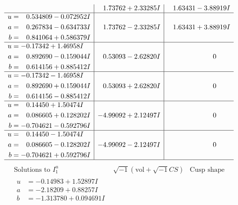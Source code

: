 \documentclass[1p]{elsarticle_modified}
\theoremstyle{definition}
\newcommand{\I}{\sqrt{-1}}
\begin{document}
$$\begin{array}{c|c|c}
 & \phantom{-}1.73762 + 2.33285 I & \phantom{-}1.63431 - 3.88919 I \\ \hline\begin{aligned}
u &= \phantom{-}0.534809 - 0.072952 I \\
a &= \phantom{-}0.267834 - 0.634733 I \\
b &= \phantom{-}0.841064 + 0.586379 I\end{aligned}
 & \phantom{-}1.73762 - 2.33285 I & \phantom{-}1.63431 + 3.88919 I \\ \hline\begin{aligned}
u &= -0.17342 + 1.46958 I \\
a &= \phantom{-}0.892690 - 0.159044 I \\
b &= \phantom{-}0.614156 + 0.885412 I\end{aligned}
 & \phantom{-}0.53093 - 2.62820 I & \phantom{-0.000000 } 0 \\ \hline\begin{aligned}
u &= -0.17342 - 1.46958 I \\
a &= \phantom{-}0.892690 + 0.159044 I \\
b &= \phantom{-}0.614156 - 0.885412 I\end{aligned}
 & \phantom{-}0.53093 + 2.62820 I & \phantom{-0.000000 } 0 \\ \hline\begin{aligned}
u &= \phantom{-}0.14450 + 1.50474 I \\
a &= \phantom{-}0.086605 + 0.128202 I \\
b &= -0.704621 - 0.592796 I\end{aligned}
 & -4.99092 + 2.12497 I & \phantom{-0.000000 } 0 \\ \hline\begin{aligned}
u &= \phantom{-}0.14450 - 1.50474 I \\
a &= \phantom{-}0.086605 - 0.128202 I \\
b &= -0.704621 + 0.592796 I\end{aligned}
 & -4.99092 - 2.12497 I & \phantom{-0.000000 } 0\\
 \hline 
 \end{array}$$\newpage$$\begin{array}{c|c|c}  
\text{Solutions to }I^u_{1}& \I (\text{vol} + \sqrt{-1}CS) & \text{Cusp shape}\\
 \hline 
\begin{aligned}
u &= -0.14983 + 1.52897 I \\
a &= -2.18209 + 0.88257 I \\
b &= -1.313780 + 0.094691 I\end{aligned}

\end{array}$$
\end{document}
